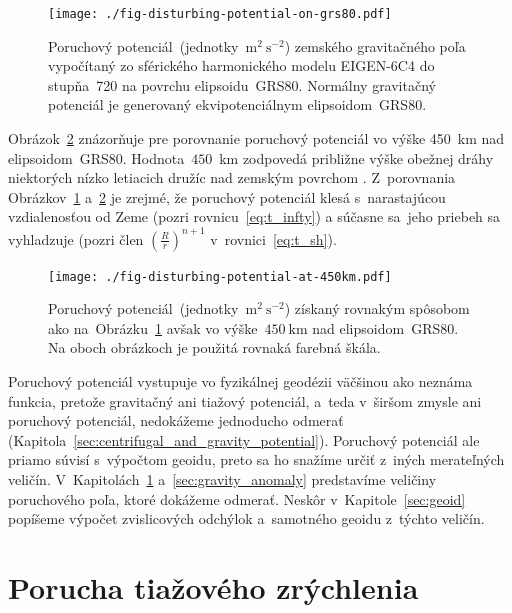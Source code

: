 \documentclass[a4paper, 12pt]{book}
\begin{document}
\begin{figure}
\centering
\texttt{[image: ./fig-disturbing-potential-on-grs80.pdf]}
\caption{Poruchový potenciál~(jednotky~$\mathrm{m}^2 \ \mathrm{s}^{-2}$) 
zemského gravitačného poľa vypočítaný zo sférického harmonického modelu 
EIGEN-6C4 do stupňa~720 na povrchu elipsoidu~GRS80.  Normálny gravitačný 
potenciál je generovaný ekvipotenciálnym elipsoidom~GRS80.}
\label{fig:disturbing_potential_on_grs80}
\end{figure}

Obrázok~\ref{fig:disturbing_potential_at_450km} znázorňuje pre porovnanie 
poruchový potenciál vo výške 450~km nad elipsoidom~GRS80.  Hodnota~$450$~km 
zodpovedá približne výške obežnej dráhy niektorých nízko letiacich družíc nad 
zemským povrchom \parencite[pozri napríklad][]{MoritzPhysicalGeodesy}.  
Z~porovnania Obrázkov~\ref{fig:disturbing_potential_on_grs80} 
a~\ref{fig:disturbing_potential_at_450km} je zrejmé, že poruchový potenciál 
klesá s~narastajúcou vzdialenosťou od Zeme (pozri rovnicu~\ref{eq:t_infty}) 
a súčasne sa~jeho priebeh sa vyhladzuje (pozri člen $\left( \frac{R}{r} 
\right)^{n + 1}$ v~rovnici~\ref{eq:t_sh}).

\begin{figure}
\centering
\texttt{[image: ./fig-disturbing-potential-at-450km.pdf]}
\caption{Poruchový potenciál~(jednotky~$\mathrm{m}^2 \ \mathrm{s}^{-2}$) 
získaný rovnakým spôsobom ako 
na~Obrázku~\ref{fig:disturbing_potential_on_grs80} avšak vo výške~$450\ 
\mathrm{km}$ nad elipsoidom~GRS80.  Na oboch obrázkoch je použitá rovnaká 
farebná škála.}
\label{fig:disturbing_potential_at_450km}
\end{figure}

Poruchový potenciál vystupuje vo fyzikálnej geodézii väčšinou ako neznáma 
funkcia, pretože gravitačný ani tiažový potenciál, a~teda v~širšom zmysle ani 
poruchový potenciál, nedokážeme jednoducho odmerať 
(Kapitola~\ref{sec:centrifugal_and_gravity_potential}).  Poruchový potenciál 
ale priamo súvisí s~výpočtom geoidu, preto sa ho snažíme určiť z~iných 
merateľných veličín.  V~Kapitolách~\ref{sec:gravity_disturbance} 
a~\ref{sec:gravity_anomaly} predstavíme veličiny poruchového poľa, ktoré 
dokážeme odmerať.  Neskôr v~Kapitole~\ref{sec:geoid} popíšeme výpočet 
zvislicových odchýlok a~samotného geoidu z~týchto veličín.





\section{Porucha tiažového zrýchlenia}
\label{sec:gravity_disturbance}
\end{document}
